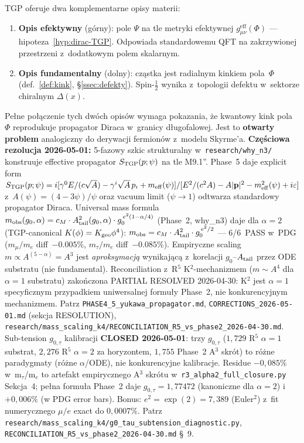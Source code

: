 \begin{remark}\label{rem:materia-hierarchia}
TGP oferuje dwa komplementarne opisy materii:
\begin{enumerate}[nosep]
  \item \textbf{Opis efektywny} (g\'orny): pole $\Psi$
    na tle metryki efektywnej $g_{\mu\nu}^{\mathrm{eff}}(\Phi)$
    --- hipoteza~\ref{hyp:dirac-TGP}. Odpowiada standardowemu QFT
    na zakrzywionej przestrzeni z~dodatkowym polem skalarnym.
  \item \textbf{Opis fundamentalny} (dolny): cz\k{a}stka jest
    radialnym kinkiem pola~$\Phi$ (def.~\ref{def:kink},
    \S\ref{ssec:defekty}). Spin-$\frac{1}{2}$ wynika z~topologii
    defektu w~sektorze chiralnym $\Delta(x)$.
\end{enumerate}
Pe\l{}ne po\l{}\k{a}czenie tych dw\'och opis\'ow wymaga
pokazania, \.ze kwantowy kink pola $\Phi$ reprodukuje
propagator Diraca w~granicy d\l{}ugofalowej. Jest to
\textbf{otwarty problem} analogiczny do derywacji
fermion\'ow z~modelu Skyrme'a.
\textbf{Cz\k{e}\'sciowa rezolucja 2026-05-01:} 5-fazowy szkic
strukturalny w~\texttt{research/why\_n3/} konstruuje effective
propagator $S_{\rm TGP}(p; \psi)$ na tle M9.1''. Phase~5 daje
explicit form $S_{\rm TGP}(p;\psi) = i[\gamma^0 E/(c\sqrt{A})
- \gamma^i\sqrt{A}\,p_i + m_{\rm eff}(\psi)] /
[E^2/(c^2 A) - A|\mathbf{p}|^2 - m_{\rm eff}^2(\psi) + i\varepsilon]$
z~$A(\psi) = (4-3\psi)/\psi$ oraz vacuum limit ($\psi \to 1$)
odtwarza standardowy propagator Diraca. Universal mass formula
$m_{\rm obs}(g_0,\alpha) = c_M \cdot A_{\rm tail}^2(g_0,\alpha)
\cdot g_0^{\,e^2(1-\alpha/4)}$ (Phase~2, why\_n3) daje
dla $\alpha=2$ (TGP-canonical $K(\phi)=K_{\rm geo}\phi^4$):
$m_{\rm obs} = c_M \cdot A_{\rm tail}^2 \cdot g_0^{\,e^2/2}$ ---
6/6~PASS w~PDG ($m_\mu/m_e$ diff~$-0.005\%$,
$m_\tau/m_e$ diff~$-0.085\%$). Empiryczne scaling
$m \propto A^{(5-\alpha)} = A^3$ jest \emph{aproksymacj\k{a}}
wynikaj\k{a}c\k{a} z~korelacji $g_0$--$A_{\rm tail}$ przez ODE
substratu (nie fundamental). Reconciliation z~R$^5$
K$^2$-mechanizmem ($m \sim A^4$ dla $\alpha=1$ substratu)
zako\'nczona PARTIAL RESOLVED 2026-04-30: K$^2$ jest
$\alpha=1$ specyficznym przypadkiem uniwersalnej formu\l{}y
Phase~2, nie konkurencyjnym mechanizmem. Patrz
\texttt{PHASE4\_5\_yukawa\_propagator.md},
\texttt{CORRECTIONS\_2026-05-01.md} (sekcja RESOLUTION),
\texttt{research/mass\_scaling\_k4/RECONCILIATION\_R5\_vs\_phase2\_2026-04-30.md}.
Sub-tension $g_{0,\tau}$ kalibracji \textbf{CLOSED 2026-05-01}:
trzy $g_{0,\tau}$ ($1{,}729$ R$^5$ $\alpha=1$ substrat, $2{,}276$ R$^5$
$\alpha=2$ za horyzontem, $1{,}755$ Phase~2 A$^3$ skr\'ot) to r\'o\.zne
paradygmaty (r\'o\.zne $\alpha$/ODE), nie konkurencyjne kalibracje. Residue
$-0{,}085\%$ w~m$_\tau$/m$_e$ to artefakt empirycznego A$^3$ skr\'otu
w~\texttt{r3\_alpha2\_full\_closure.py} Sekcja~4; pe\l{}na formu\l{}a Phase~2
daje \textbf{$g_{0,\tau}=1{,}77472$} (kanoniczne dla $\alpha=2$) i~$+0{,}006\%$
(w PDG error bars). Bonus: $e^2 = \exp(2) = 7{,}389$ (Euler$^2$) z~fit numerycznego $\mu/e$
exact do $0{,}0007\%$. Patrz
\texttt{research/mass\_scaling\_k4/g0\_tau\_subtension\_diagnostic.py},
\texttt{RECONCILIATION\_R5\_vs\_phase2\_2026-04-30.md} \S~9.


\end{remark}
